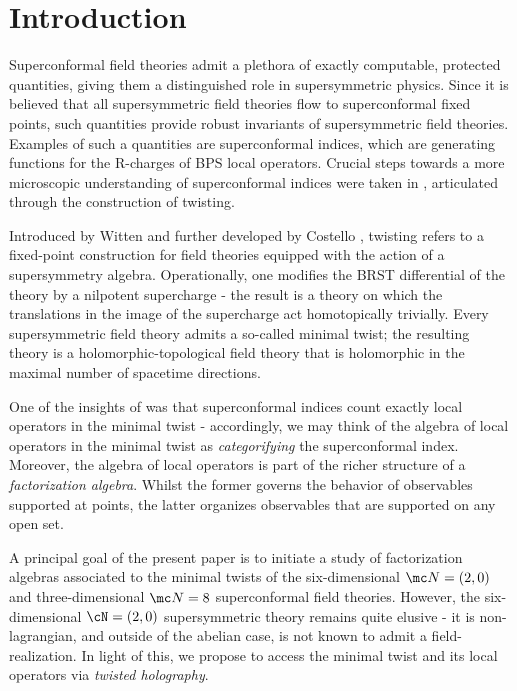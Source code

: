 %
%
%

\section{Introduction}
Superconformal field theories admit a plethora of exactly computable, protected quantities, giving them a distinguished role in supersymmetric physics. Since it is believed that all supersymmetric field theories flow to superconformal fixed points, such quantities provide robust invariants of supersymmetric field theories. Examples of such a quantities are superconformal indices, which are generating functions for the R-charges of BPS local operators. Crucial steps towards a more microscopic understanding of superconformal indices were taken in \cite{}, articulated through the construction of twisting.

Introduced by Witten \cite{} and further developed by Costello \cite{}, twisting refers to a fixed-point construction for field theories equipped with the action of a supersymmetry algebra. Operationally, one modifies the BRST differential of the theory by a nilpotent supercharge - the result is a theory on which the translations in the image of the supercharge act homotopically trivially. Every supersymmetric field theory admits a so-called minimal twist; the resulting theory is a holomorphic-topological field theory that is holomorphic in the maximal number of spacetime directions.

One of the insights of \cite{} was that superconformal indices count exactly local operators in the minimal twist - accordingly, we may think of the algebra of local operators in the minimal twist as \textit{categorifying} the superconformal index. Moreover, the algebra of local operators is part of the richer structure of a \textit{factorization algebra}. Whilst the former governs the behavior of observables supported at points, the latter organizes observables that are supported on any open set.

A principal goal of the present paper is to initiate a study of factorization algebras associated to the minimal twists of the six-dimensional $\mc N=(2,0)$ and three-dimensional $\mc N=8$ superconformal field theories. However, the six-dimensional $\cN=(2,0)$ supersymmetric theory remains quite elusive - it is non-lagrangian, and outside of the abelian case, is not known to admit a field-realization. In light of this, we propose to access the minimal twist and its local operators via \textit{twisted holography}.

